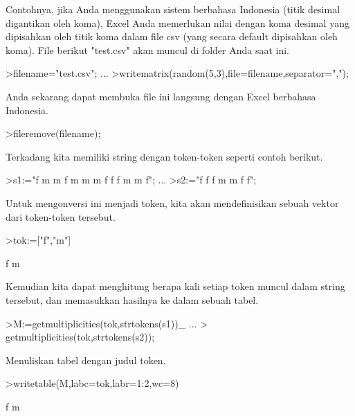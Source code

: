 \documentclass[a4paper,10pt]{article}
\begin{document}
\begin{eulernotebook}
\begin{eulercomment}
\begin{eulercomment}
\begin{eulercomment}
\begin{eulercomment}
\begin{eulercomment}
\begin{eulercomment}
\begin{eulercomment}
Contohnya, jika Anda menggunakan sistem berbahasa Indonesia (titik
desimal digantikan oleh koma), Excel Anda memerlukan nilai dengan koma
desimal yang dipisahkan oleh titik koma dalam file csv (yang secara
default dipisahkan oleh koma). File berikut "test.csv" akan muncul di
folder Anda saat ini.
\end{eulercomment}
\begin{eulerprompt}
>filename="test.csv"; ...
>writematrix(random(5,3),file=filename,separator=",");
\end{eulerprompt}
\begin{eulercomment}
Anda sekarang dapat membuka file ini langsung dengan Excel berbahasa
Indonesia.
\end{eulercomment}
\begin{eulerprompt}
>fileremove(filename);
\end{eulerprompt}
\begin{eulercomment}
Terkadang kita memiliki string dengan token-token seperti contoh
berikut.
\end{eulercomment}
\begin{eulerprompt}
>s1:="f m m f m m m f f f m m f";  ...
>s2:="f f f m m f f";
\end{eulerprompt}
\begin{eulercomment}
Untuk mengonversi ini menjadi token, kita akan mendefinisikan sebuah
vektor dari token-token tersebut.
\end{eulercomment}
\begin{eulerprompt}
>tok:=["f","m"]
\end{eulerprompt}
\begin{euleroutput}
  f
  m
\end{euleroutput}
\begin{eulercomment}
Kemudian kita dapat menghitung berapa kali setiap token muncul dalam
string tersebut, dan memasukkan hasilnya ke dalam sebuah tabel.
\end{eulercomment}
\begin{eulerprompt}
>M:=getmultiplicities(tok,strtokens(s1))_ ...
>  getmultiplicities(tok,strtokens(s2));
\end{eulerprompt}
\begin{eulercomment}
Menuliskan tabel dengan judul token.
\end{eulercomment}
\begin{eulerprompt}
>writetable(M,labc=tok,labr=1:2,wc=8)
\end{eulerprompt}
\begin{euleroutput}
                 f       m

\end{euleroutput}
\end{eulercomment}
\end{eulercomment}
\end{eulercomment}
\end{eulercomment}
\end{eulercomment}
\end{eulercomment}
\end{eulernotebook}
\end{document}
